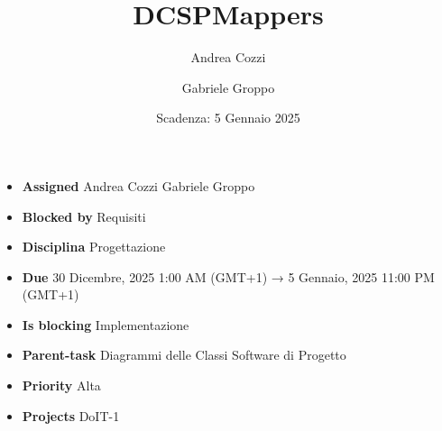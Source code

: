 \title{DCSPMappers}
\author{Andrea Cozzi \and Gabriele Groppo}
\date{Scadenza: 5 Gennaio 2025}

\maketitle

\begin{itemize}
    \item \textbf{Assigned} Andrea Cozzi Gabriele Groppo
    \item \textbf{Blocked by} Requisiti
    \item \textbf{Disciplina} Progettazione
    \item \textbf{Due} 30 Dicembre, 2025 1:00 AM (GMT+1) → 5 Gennaio, 2025 11:00 PM (GMT+1)
    \item \textbf{Is blocking} Implementazione
    \item \textbf{Parent-task} Diagrammi delle Classi Software di Progetto
    \item \textbf{Priority} Alta
    \item \textbf{Projects} DoIT-1
\end{itemize}